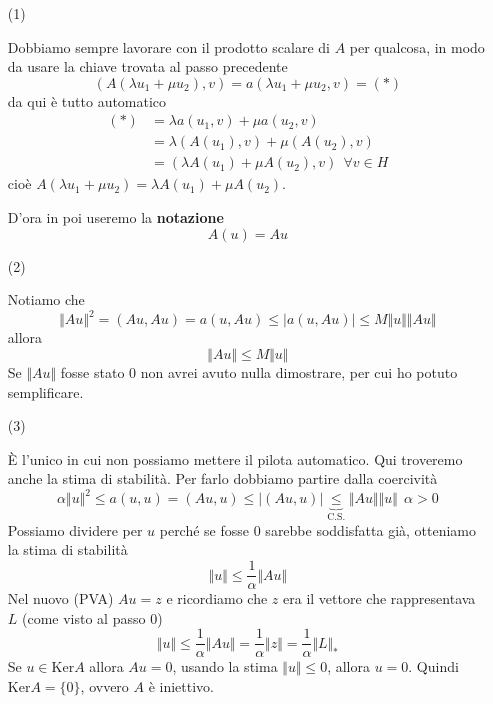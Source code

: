 \documentclass[10pt,a4paper,twoside,openright]{book}
\begin{document}
\begin{dimostrazione}
\begin{itemize}
		\item[(1)]

		Dobbiamo sempre lavorare con il prodotto scalare di $A$ per qualcosa, in modo da usare la chiave trovata al passo precedente
		\begin{equation*}
			( A( \lambda u_{1} +\mu u_{2}),v) =a( \lambda u_{1} +\mu u_{2},v) =(*)
		\end{equation*}
		da qui è tutto automatico
		\begin{align*}
			(*) & =\lambda a(u_{1},v) +\mu a(u_{2},v)\\
			    & =\lambda (A(u_{1}),v) +\mu (A(u_{2}),v)\\
			    & =(\lambda A(u_{1}) +\mu A(u_{2}),v) \ \ \forall v\in H
		\end{align*}
		cioè $A( \lambda u_{1} +\mu u_{2}) =\lambda A(u_{1}) +\mu A(u_{2})$.

		D'ora in poi useremo la \textbf{notazione}
		\begin{equation*}
			A(u) =Au
		\end{equation*}


		\item[(2)]

		Notiamo che
		\begin{equation*}
			\Vert Au\Vert ^{2} =(Au,Au) =a(u,Au) \leqslant | a(u,Au)| \leqslant M\Vert u\Vert \Vert Au\Vert 
		\end{equation*}
		allora
		\begin{equation*}
			\Vert Au\Vert \leqslant M\Vert u\Vert 
		\end{equation*}
		Se $\Vert Au\Vert $ fosse stato $0$ non avrei avuto nulla dimostrare, per cui ho potuto semplificare.



		\item[(3)]

		È l'unico in cui non possiamo mettere il pilota automatico. Qui troveremo anche la stima di stabilità. Per farlo dobbiamo partire dalla coercività
		\begin{equation*}
			\alpha \Vert u\Vert ^{2} \leqslant a(u,u) =(Au,u) \leqslant | (Au,u)| \underbrace{\leqslant }_{\text{C.S.}}\Vert Au\Vert \Vert u\Vert \ \ \alpha  >0
		\end{equation*}
		Possiamo dividere per $u$ perché se fosse $0$ sarebbe soddisfatta già, otteniamo la stima di stabilità
		\begin{equation*}
			\Vert u\Vert \leqslant \frac{1}{\alpha }\Vert Au\Vert 
		\end{equation*}
		Nel nuovo (PVA) $Au=z$ e ricordiamo che $z$ era il vettore che rappresentava $L$ (come visto al passo 0)
		\begin{equation*}
			\Vert u\Vert \leqslant \frac{1}{\alpha }\Vert Au\Vert =\frac{1}{\alpha }\Vert z\Vert =\frac{1}{\alpha }\Vert L\Vert _{*}
		\end{equation*}
		Se $u\in \mathrm{Ker} A$ allora $Au=0$, usando la stima $\Vert u\Vert \leqslant 0$, allora $u=0$. Quindi $\mathrm{Ker} A=\{0\}$, ovvero $A$ è iniettivo.




\end{itemize}
\end{dimostrazione}
\end{document}
